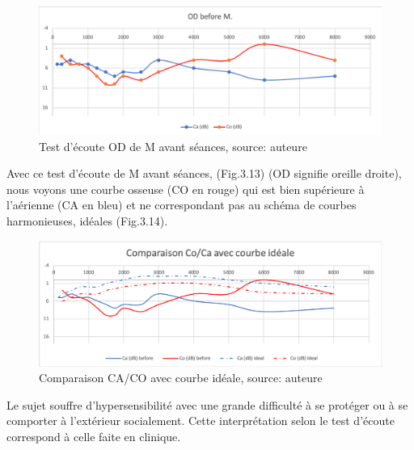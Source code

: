\begin{figure}[tbh]
	\centering
	\includegraphics[width=0.7\linewidth]{images/clinique/od_before_m.png}
	\caption[Test d'écoute de M avant séances, OD]{Test d'écoute OD de M avant séances, source: 
	auteure}
	\label{fig:odbeforemeyer}
\end{figure}

Avec ce test d'écoute de M avant séances, (Fig.3.13) (OD signifie oreille droite), nous voyons une 
courbe osseuse (CO en rouge) qui est bien supérieure à l'aérienne (CA en bleu) et ne correspondant pas 
au schéma 
de courbes harmonieuses, idéales (Fig.3.14). 

	\begin{figure}[tbh]
	\centering
	\includegraphics[width=0.7\linewidth]{images/clinique/comparaison_ideal_avant.png}
	\caption[Comparaison avec la courbe idéale]{Comparaison CA/CO avec courbe idéale, source: 
		auteure}
	\label{fig:comparisonbcbabeforevsidealcurvemeyer}
\end{figure}

Le sujet souffre d'hypersensibilité 
avec une 
grande 
difficulté à se protéger ou à se comporter à l'extérieur socialement. Cette interprétation selon le test 
d'écoute   
correspond à 
celle faite en clinique.




